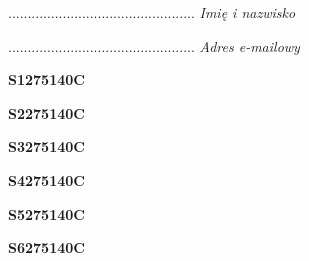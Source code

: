 \begin{turn}{90}\begin{minipage}{\linewidth} \vspace{20mm} ................................................  \textit{Imię i nazwisko}\end{minipage}\end{turn}

\begin{turn}{90}\begin{minipage}{\linewidth} \vspace{20mm} ................................................  \textit{Adres e-mailowy}\end{minipage}\end{turn}

\begin{turn}{90}\huge \begin{minipage}{\linewidth} \vspace{10mm}\textbf{S1275140C}\end{minipage}\end{turn}

\begin{turn}{90}\huge \begin{minipage}{\linewidth} \vspace{10mm}\textbf{S2275140C}\end{minipage}\end{turn}

\begin{turn}{90}\huge \begin{minipage}{\linewidth} \vspace{10mm}\textbf{S3275140C}\end{minipage}\end{turn}

\begin{turn}{90}\huge \begin{minipage}{\linewidth} \vspace{10mm}\textbf{S4275140C}\end{minipage}\end{turn}

\begin{turn}{90}\huge \begin{minipage}{\linewidth} \vspace{10mm}\textbf{S5275140C}\end{minipage}\end{turn}

\begin{turn}{90}\huge \begin{minipage}{\linewidth} \vspace{10mm}\textbf{S6275140C}\end{minipage}\end{turn}

